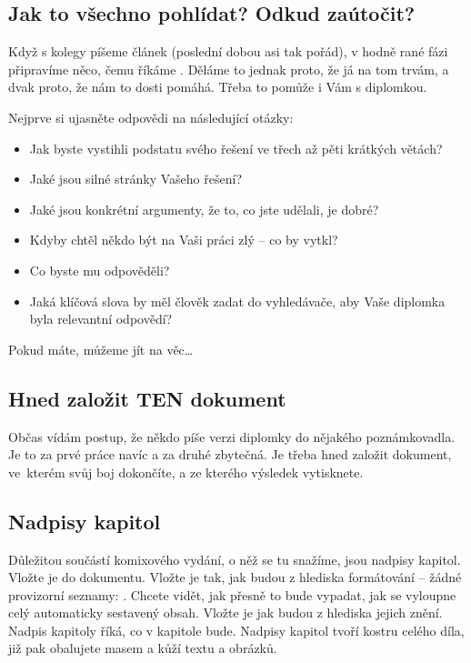 \subsection*{Jak to všechno pohlídat? Odkud zaútočit?}
Když s kolegy píšeme článek (poslední dobou asi tak pořád), v hodně rané fázi připravíme něco, čemu říkáme . Děláme to jednak proto, že já na tom trvám, a dvak proto, že nám to dosti pomáhá. Třeba to pomůže i Vám s diplomkou.

Nejprve si ujasněte odpovědi na následující otázky:
\begin{itemize}
  \item{Jak byste vystihli podstatu svého řešení ve třech až pěti krátkých větách?}
  \item{Jaké jsou silné stránky Vašeho řešení?}
  \item{Jaké jsou konkrétní argumenty, že to, co jste udělali, je dobré?}
  \item{Kdyby chtěl někdo být na Vaši práci zlý -- co by vytkl?}
  \item{Co byste mu odpověděli?}
  \item{Jaká klíčová slova by měl člověk zadat do vyhledávače, aby Vaše diplomka byla relevantní odpovědí?}
\end{itemize}

Pokud máte, můžeme jít na věc\ldots

\subsection*{Hned založit TEN dokument}
Občas vídám postup, že někdo píše  verzi diplomky do nějakého poznámkovadla. Je to za prvé práce navíc a za druhé zbytečná. Je třeba hned založit dokument, ve~kterém svůj boj dokončíte, a ze kterého výsledek vytisknete.

\subsection*{Nadpisy kapitol}
Důležitou součástí komixového vydání, o něž se tu snažíme, jsou nadpisy kapitol. Vložte je do dokumentu. Vložte je tak, jak budou z hlediska formátování -- žádné provizorní seznamy: . Chcete vidět, jak přesně to bude vypadat, jak se vyloupne celý automaticky sestavený obsah. Vložte je jak budou z hlediska jejich znění. Nadpis kapitoly říká, co v kapitole bude. Nadpisy kapitol tvoří kostru celého díla, již pak obalujete masem a kůží textu a obrázků.

